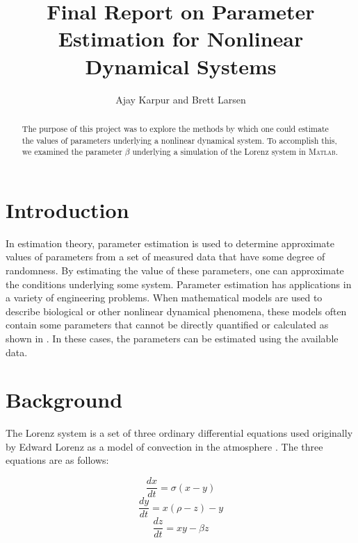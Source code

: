 \documentclass{article}[11pt]
\title{Final Report on Parameter Estimation for Nonlinear Dynamical Systems}
\author{Ajay Karpur and Brett Larsen}
\date{}
\newcommand{\Matlab}{\textsc{Matlab}}
\begin{document}
\maketitle
\doublespace


\begin{abstract}
The purpose of this project was to explore the methods by which one could estimate the values of parameters underlying a nonlinear dynamical system. To accomplish this, we examined the parameter $\beta$ underlying a simulation of the Lorenz system in \Matlab.
\end{abstract}

\section{Introduction}
\label{sec:intro}
In estimation theory, parameter estimation is used to determine approximate values of parameters from a set of measured data that have some degree of randomness. By estimating the value of these parameters, one can approximate the conditions underlying some system. Parameter estimation has applications in a variety of engineering problems. When mathematical models are used to describe biological or other nonlinear dynamical phenomena, these models often contain some parameters that cannot be directly quantified or calculated as shown in \cite{Bravi}. In these cases, the parameters can be estimated using the available data.



\section{Background}
\label{sec:intro}
The Lorenz system is a set of three ordinary differential equations used originally by Edward Lorenz as a model of convection in the atmosphere \cite{bourke}.  The three equations are as follows:

\begin{equation}
	\frac{dx}{dt} = \sigma (x - y)
\end{equation}
\begin{equation}
	\frac{dy}{dt} = x (\rho - z) - y
\end{equation}
\begin{equation}
	\frac{dz}{dt} = xy - \beta z
\end{equation}
\end{document}
